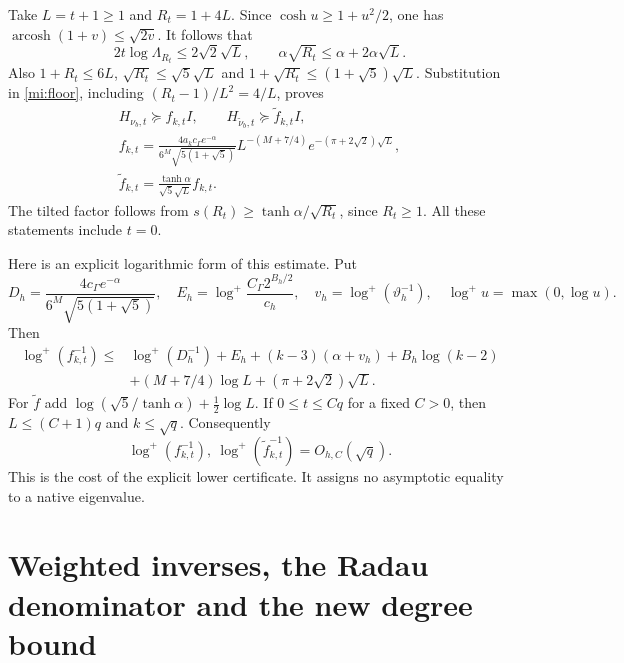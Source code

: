 \documentclass[11pt]{article}
\begin{document}
Take $L=t+1\ge1$ and $R_t=1+4L$.
Since $\cosh u\ge1+u^2/2$, one has
$\operatorname{arcosh}(1+v)\le\sqrt{2v}$. It follows that
\[
 2t\log\Lambda_{R_t}\le2\sqrt2\sqrt L,\qquad
 \alpha\sqrt{R_t}\le\alpha+2\alpha\sqrt L.
\]
Also $1+R_t\le6L$, $\sqrt{R_t}\le\sqrt5\sqrt L$ and
$1+\sqrt{R_t}\le(1+\sqrt5)\sqrt L$. Substitution in
\eqref{mi:floor}, including $(R_t-1)/L^2=4/L$, proves
\begin{equation}\tag{MI9}\label{mi:rootfloor}
 \begin{gathered}
 H_{\nu_b,t}\succeq f_{k,t}I,\qquad
 H_{\widetilde\nu_b,t}\succeq\widetilde f_{k,t}I,\\
 f_{k,t}=
 \frac{4a_kc_\Gamma e^{-\alpha}}
 {6^M\sqrt{5(1+\sqrt5)}}L^{-(M+7/4)}
 e^{-(\pi+2\sqrt2)\sqrt L},\\
 \widetilde f_{k,t}=\frac{\tanh\alpha}{\sqrt5\sqrt L}f_{k,t}.
 \end{gathered}
\end{equation}
The tilted factor follows from
$s(R_t)\ge\tanh\alpha/\sqrt{R_t}$, since $R_t\ge1$.
All these statements include $t=0$.

Here is an explicit logarithmic form of this estimate. Put
\[
 D_h=\frac{4c_\Gamma e^{-\alpha}}
 {6^M\sqrt{5(1+\sqrt5)}},\quad
 E_h=\log^+\frac{C_\Gamma2^{B_h/2}}{c_h},\quad
 v_h=\log^+(\vartheta_h^{-1}),\quad
 \log^+u=\max(0,\log u).
\]
Then
\begin{equation}\tag{MI10}\label{mi:log}
\begin{split}
 \log^+(f_{k,t}^{-1})\le{}&
 \log^+(D_h^{-1})+E_h+(k-3)(\alpha+v_h)
       +B_h\log(k-2)\\
 &+(M+7/4)\log L+(\pi+2\sqrt2)\sqrt L.
\end{split}
\end{equation}
For $\widetilde f$ add
$\log(\sqrt5/\tanh\alpha)+\frac12\log L$.
If $0\le t\le Cq$ for a fixed $C>0$, then
$L\le(C+1)q$ and $k\le\sqrt q$. Consequently
\[
 \log^+(f_{k,t}^{-1}),\
 \log^+(\widetilde f_{k,t}^{-1})
 =O_{h,C}(\sqrt q).
\]
This is the cost of the explicit lower certificate. It assigns no
asymptotic equality to a native eigenvalue.

\section{Weighted inverses, the Radau denominator and the new degree bound}
\end{document}
